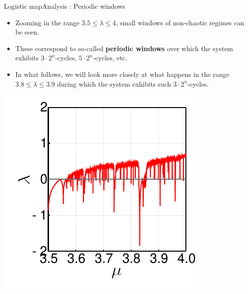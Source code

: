 \documentclass[usenames,dvipsnames,svgnames,10pt,aspectratio=169]{beamer}
\begin{document}
\begin{frame}[t, c]{Logistic map}{Analysis : Periodic windows}
	\begin{minipage}{.68\textwidth}
		\begin{itemize}
			\item Zooming in the range \(3.5 \leq \lambda \leq 4 \), small windows of non-chaotic regimes can be seen.

			\bigskip

			\item These correspond to so-called \textbf{periodic windows} over which the system exhibits \(3 \cdot 2^n\)-cycles, \(5 \cdot 2^n\)-cycles, etc.

			\bigskip

			\item In what follows, we will look more closely at what happens in the range \( 3.8 \leq \lambda \leq 3.9 \) during which the system exhibits such \(3 \cdot 2^n\)-cycles.
		\end{itemize}
	\end{minipage}%
	\hfill
	\begin{minipage}{.28\textwidth}
		\centering
		\includegraphics[width=\textwidth]{lyapunov_exponents_zoom}
	\end{minipage}

	\vspace{1cm}
\end{frame}
\end{document}

